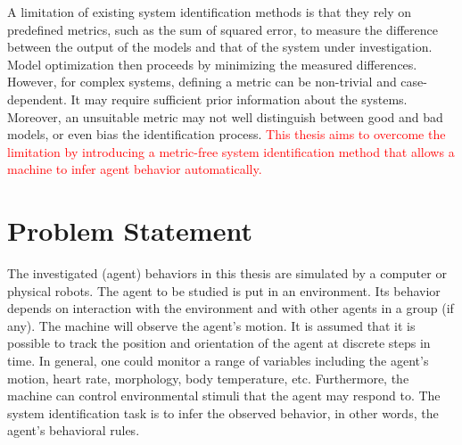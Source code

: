 A limitation of existing system identification methods is that they rely on predefined metrics, such as the sum of squared error, to measure the difference between the output of the models and that of the system under investigation. Model optimization then proceeds by minimizing the measured differences. However, for complex systems, defining a metric can be non-trivial and case-dependent. It may require sufficient prior information about the systems. Moreover, an unsuitable metric may not well distinguish between good and bad models, or even bias the identification process. \textcolor{red}{This thesis aims to overcome the limitation by introducing a metric-free system identification method that allows a machine to infer agent behavior automatically.}


\section{Problem Statement}

The investigated (agent) behaviors in this thesis are simulated by a computer or physical robots. The agent to be studied is put in an environment. Its behavior depends on interaction with the environment and with other agents in a group (if any). The machine will observe the agent's motion. It is assumed that it is possible to track the position and orientation of the agent at discrete steps in time. In general, one could monitor a range of variables including the agent's motion, heart rate, morphology, body temperature, etc. Furthermore, the machine can control environmental stimuli that the agent may respond to. The system identification task is to infer the observed behavior, in other words, the agent's behavioral rules. 

